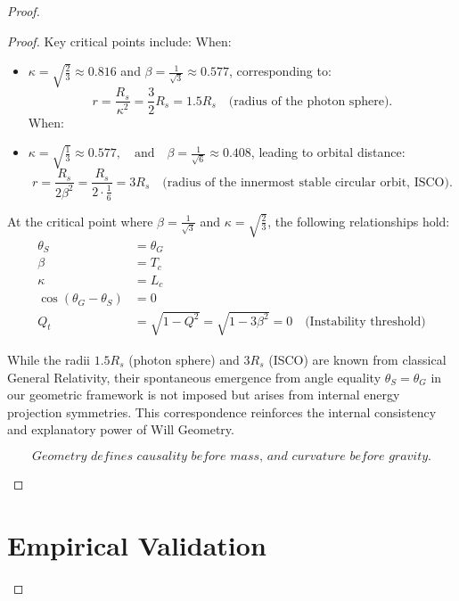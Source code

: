 \documentclass{article}
\begin{document}
\begin{theorem}
\begin{proof}
\begin{proof}
Key critical points include:
When:
\begin{itemize}
    \item \(\kappa = \sqrt{\frac{2}{3}} \approx 0.816\) and \(\beta = \frac{1}{\sqrt{3}} \approx 0.577\), corresponding to:
    \[
    r = \frac{R_s}{\kappa^2} =\frac{3}{2}R_s = 1.5R_s \quad \text{(radius of the photon sphere)}.
    \]
    When:
    \item      \( \kappa=\sqrt{\frac{1}{3}}\approx 0.577, \quad \text{and} \quad  \beta = \frac{1}{\sqrt{6}} \approx 0.408\), leading to orbital distance:
    \[
    r = \frac{R_s}{2\beta^2} = \frac{R_s}{2 \cdot \frac{1}{6}} = 3R_s \quad \text{(radius of the innermost stable circular orbit, ISCO)}.
    \]
\end{itemize}

At the critical point where \(\beta = \frac{1}{\sqrt{3}}\) and \(\kappa = \sqrt{\frac{2}{3}}\), the following relationships hold:
\begin{align}
\theta_S &= \theta_G \\
\beta &= T_c \\
\kappa &= L_c \\
\cos(\theta_{G}-\theta_{S}) &= 0 \\
Q_t &= \sqrt{1-Q^2} =\sqrt{1-3\beta^2} = 0 \quad \text{(Instability threshold)}
\end{align}

\begin{tcolorbox}[colback=gray!5,colframe=black!40!black,title=Interpretive Note]
While the radii \(1.5R_s\) (photon sphere) and \(3R_s\) (ISCO) are known from classical General Relativity, their spontaneous emergence from angle equality \(\theta_S = \theta_G\) in our geometric framework is not imposed but arises from internal energy projection symmetries. This correspondence reinforces the internal consistency and explanatory power of Will Geometry.
\end{tcolorbox}

\begin{tcolorbox}[colback=gray!5, colframe=black!80!black, title=Projectional Principle]
\[
\textit{Geometry defines causality before mass, and curvature before gravity.}
\]
\end{tcolorbox}
\end{proof}


\section{Empirical Validation}


\end{proof}
\end{theorem}
\end{document}
